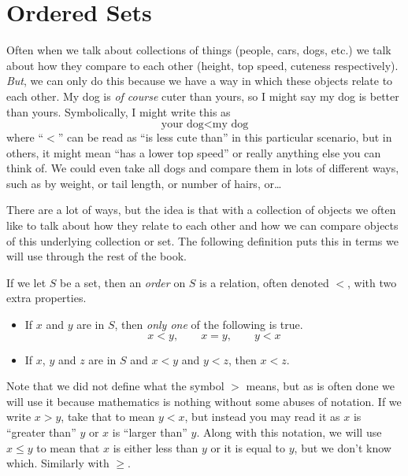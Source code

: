 \section{Ordered Sets}\label{sec:ordered-sets}

Often when we talk about collections of things (people, cars, dogs, etc.) we
talk about how they compare to each other (height, top speed, cuteness
respectively). \emph{But}, we can only do this because we have a way in which
these objects relate to each other. My dog is \emph{of course} cuter than
yours, so I might say my dog is better than yours. Symbolically, I might write
this as
\begin{equation*}\label{eq:doges}
    \text{your dog} < \text{my dog}
\end{equation*}
where ``$<$'' can be read as ``is less cute than'' in this particular scenario,
but in others, it might mean ``has a lower top speed'' or really anything else
you can think of. We could even take all dogs and compare them in lots of
different ways, such as by weight, or tail length, or number of hairs, or\ldots

There are a lot of ways, but the idea is that with a collection of objects we
often like to talk about how they relate to each other and how we can compare
objects of this underlying collection or set. The following definition puts
this in terms we will use through the rest of the book.

\begin{definition}\label{def:order}
    If we let $S$ be a set, then an \emph{order} on $S$ is a relation, often
    denoted $<$, with two extra properties.
    \begin{itemize}
        \item If $x$ and $y$ are in $S$, then \emph{only one} of the following
              is true.
              \[ x < y, \qquad x = y, \qquad y < x\]
        \item If $x$, $y$ and $z$ are in $S$ and $x < y$ and $y < z$, then $x <
                  z$.
    \end{itemize}
\end{definition}

Note that we did not define what the symbol $>$ means, but as is often done we
will use it because mathematics is nothing without some abuses of notation. If
we write $x > y$, take that to mean $y < x$, but instead you may read it as $x$
is ``greater than'' $y$ or $x$ is ``larger than'' $y$. Along with this
notation, we will use $x \le y$ to mean that $x$ is either less than $y$ or it
is equal to $y$, but we don't know which. Similarly with $\ge$.

